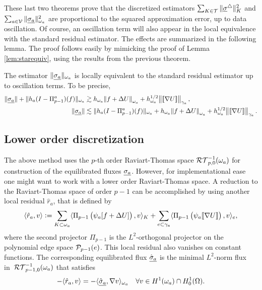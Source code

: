 \documentclass[thesis.tex]{subfiles}
\begin{document}
These last two theorems prove that the discretized estimators $\sum_{K \in \T} \uanorm{\vsig^\triangle}_K^2$ and $\sum_{a\in \V} \uanorm{\vsiga}^2_{\w_a}$ are
proportional to the squared approximation error, up to data oscillation.
Of course, an oscillation term will also appear in the local equivalence with the standard residual estimator. 
The effects are summarized in the following lemma. The proof follows easily by mimicking the proof of Lemma \ref{lem:starequiv},
using the results from the previous theorem.
\begin{lem}
  \label{lem:locequivosc}
  The estimator $\uanorm{\v{\sigma_a}}_{\w_a}$ is locally equivalent to the standard residual estimator up to oscillation terms.
  To be precise, 
  \begin{align*}
    \uanorm{\v{\sigma_a}} + \uanorm{h_a(I - \Pi_{p-1}^a)(f)}_{\w_a} &\gtrsim h_{\w_a} \norm{f + \Delta U}_{\w_a} + h^{1/2}_{\w_a} \norm{\llbracket \nabla U \rrbracket}_{\gamma_a},\\
    \uanorm{\v{\sigma_a}} &\lesssim \uanorm{h_a(I - \Pi_{p-1}^a)(f)}_{\w_a} + h_{\w_a} \norm{f + \Delta U}_{\w_a} + h^{1/2}_{\w_a} \norm{\llbracket \nabla U \rrbracket}_{\gamma_a}.
  \end{align*}
\end{lem}
\subsection{Lower order discretization}
\label{sec:lowerorder}
  The above method uses the $p$-th order Raviart-Thomas space $\RT^{-1}_{p,0}(\w_a)$ for construction of the equilibrated fluxes  $\vsiga$.
  However, for implementational ease one might want to work with a lower order Raviart-Thomas space.
  A reduction to the  Raviart-Thomas space of order $p-1$  can be accomplished by
  using another local residual $\hat r_a$, that is defined by
  \[
    \ip{\hat r_a,v} := \sum_{K \subset \w_a} \ip{\Pi_{p-1} \left(\psi_a[f + \Delta U]\right), v}_K +
    \sum_{e \subset \gamma_a} \ip{\Pi_{p-1} \left(\psi_a \llbracket \nabla U \rrbracket \right),v}_e,
  \]
  where the second projector $\Pi_{p-1}$ is the $L^2$-orthogonal projector on the polynomial edge space $\P_{p-1}(e)$.
  This local residual also vanishes on constant functions.
  The corresponding equilibrated flux $\vhsiga$  is the minimal $L^2$-norm flux in~$\RT_{p-1,0}^{-1}(\w_a)$ that satisfies
  \[
    -\ip{\hat r_a, v} = -\ip{\vhsiga, \nabla v}_{\w_a} \quad \forall v \in H^1(\w_a) \cap H_0^1(\O).
  \]
\end{document}
